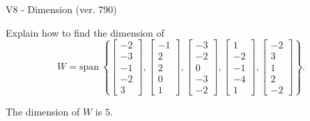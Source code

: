 \begin{exercise}
  \begin{exerciseTitle}V8 - Dimension (ver. 790)\end{exerciseTitle}
  \begin{exerciseStatement}
    Explain how to find the dimension of 
\[W=\mathrm{span}\ \left\{\left[\begin{array}{r}
-2 \\
-3 \\
-1 \\
-2 \\
3
\end{array}\right] , \left[\begin{array}{r}
-1 \\
2 \\
2 \\
0 \\
1
\end{array}\right] , \left[\begin{array}{r}
-3 \\
-2 \\
0 \\
-3 \\
-2
\end{array}\right] , \left[\begin{array}{r}
1 \\
-2 \\
-1 \\
-4 \\
1
\end{array}\right] , \left[\begin{array}{r}
-2 \\
3 \\
1 \\
2 \\
-2
\end{array}\right]\right\}.\]



  \end{exerciseStatement}
  \begin{exerciseAnswer}
   The dimension of \(W\) is  \(5\).
  


  \end{exerciseAnswer}
\end{exercise}